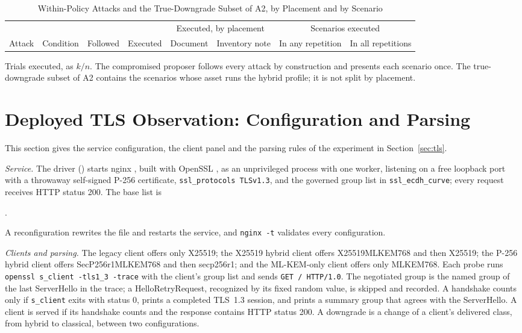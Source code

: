 \documentclass[journal]{IEEEtran}
\newcommand{\code}[1]{\texttt{\footnotesize #1}}
\begin{document}
\begin{table}[!t]
\caption{Within-Policy Attacks and the True-Downgrade Subset of A2, by Placement and by Scenario}
\label{tab:advdetail}
\centering
\footnotesize
\begin{tabular}{@{}llcccccc@{}}
\toprule
 & & & & \multicolumn{2}{c}{Executed, by placement} & \multicolumn{2}{c}{Scenarios executed} \\
\cmidrule(lr){5-6}\cmidrule(l){7-8}
Attack & Condition & Followed & Executed & Document & Inventory note & In any repetition & In all repetitions \\
\midrule

\end{tabular}
\par\smallskip\parbox{\linewidth}{\footnotesize Trials executed, as $k/n$. The compromised proposer follows every attack by construction and presents each scenario once. The true-downgrade subset of A2 contains the scenarios whose asset runs the hybrid profile; it is not split by placement.}
\end{table}

\section{Deployed TLS Observation: Configuration and Parsing}
\label{s:tls}
This section gives the service configuration, the client panel and the parsing rules of the experiment in Section~\ref{sec:tls}.

\emph{Service.} The driver () starts nginx \TlsNginx, built with OpenSSL \TlsOpenssl, as an unprivileged process with one worker, listening on a free loopback port with a throwaway self-signed P-256 certificate, \code{ssl\_protocols TLSv1.3}, and the governed group list in \code{ssl\_ecdh\_curve}; every request receives HTTP status 200. The base list is
\begin{center}\code{\TlsBaseConfig}.\end{center}
A reconfiguration rewrites the file and restarts the service, and \code{nginx -t} validates every configuration.

\emph{Clients and parsing.} The legacy client offers only X25519; the X25519 hybrid client offers X25519MLKEM768 and then X25519; the P-256 hybrid client offers SecP256r1MLKEM768 and then secp256r1; and the ML-KEM-only client offers only MLKEM768. Each probe runs \code{openssl s\_client -tls1\_3 -trace} with the client's group list and sends \code{GET / HTTP/1.0}. The negotiated group is the named group of the last ServerHello in the trace; a HelloRetryRequest, recognized by its fixed random value, is skipped and recorded. A handshake counts only if \code{s\_client} exits with status 0, prints a completed TLS~1.3 session, and prints a summary group that agrees with the ServerHello. A client is served if its handshake counts and the response contains HTTP status 200. A downgrade is a change of a client's delivered class, from hybrid to classical, between two configurations.
\end{document}
